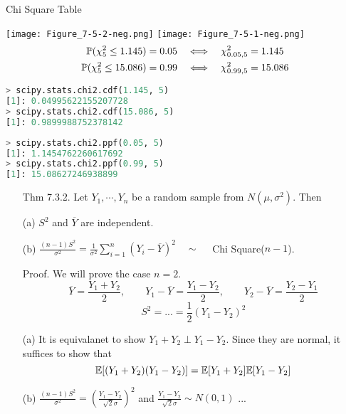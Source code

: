 \begin{frame}[fragile]{Chi Square Table}
\begin{center}
\texttt{[image: Figure\_7-5-2-neg.png]}
\texttt{[image: Figure\_7-5-1-neg.png]}
\begin{align*}
	\mathbb{P}(\chi_5^2\le 1.145) = 0.05 & \quad \Longleftrightarrow  \quad \chi_{0.05,5}^2 =1.145 \\
	\mathbb{P}(\chi_5^2\le 15.086)=0.99  & \quad \Longleftrightarrow  \quad \chi_{0.99,5}^2 =15.086
\end{align*}
\begin{minipage}{0.4\textwidth}
\begin{lstlisting}[language=Python]
> scipy.stats.chi2.cdf(1.145, 5)
[1]: 0.04995622155207728
> scipy.stats.chi2.cdf(15.086, 5)
[1]: 0.9899988752378142
\end{lstlisting}
\end{minipage}
\begin{minipage}{0.4\textwidth}
\begin{lstlisting}[language=Python]
> scipy.stats.chi2.ppf(0.05, 5)
[1]: 1.1454762260617692
> scipy.stats.chi2.ppf(0.99, 5)
[1]: 15.08627246938899
\end{lstlisting}
\end{minipage}
\end{center}
\end{frame}
\begin{frame}[fragile]
\begin{enumerate}
\item[Thm \small 7.3.2.] Let $Y_1,\cdots, Y_n$ be a random sample from $N(\mu,\sigma^2)$. Then
\item[] (a) $S^2$ and $\overline{Y}$ are independent.
\item[] (b) $\displaystyle \frac{(n-1)S^2}{\sigma^2} = \frac{1}{\sigma^2}\sum_{i=1}^n\left(Y_i-\overline{Y} \right)^2\quad \sim\quad$ Chi Square($n-1$).
\vfill
\item[Proof.] We will prove the case $n=2$.
	\[
	\overline{Y} =  \frac{Y_1+Y_2}{2},\qquad
Y_1-\overline{Y} =  \frac{Y_1-Y_2}{2}, \qquad
Y_2-\overline{Y} =  \frac{Y_2-Y_1}{2}
	\]
	\[
		S^2 = ...=  \frac{1}{2} \left( Y_1-Y_2 \right )^2
	\]
	\vfill
\item[(a)] It is equivalanet to show $Y_1+Y_2 \perp Y_1-Y_2$. Since they are normal, it suffices to show that
	\[
		\mathbb{E}[(Y_1+Y_2)(Y_1-Y_2)] =
		\mathbb{E}[Y_1+Y_2]
		\mathbb{E}[Y_1-Y_2]
	\]
	\vfill
\item[(b)] $\frac{(n-1)S^2}{\sigma^2} = \left(  \frac{Y_1-Y_2}{\sqrt{2}\sigma} \right)^2 $ and $\frac{Y_1-Y_2}{\sqrt{2}\sigma}\sim N(0,1)$ ...
	\myEnd
\end{enumerate}

\end{frame}

